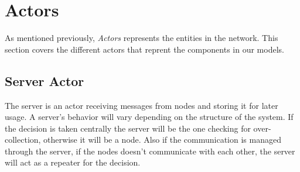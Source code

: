 






\section{Actors}

As mentioned previously, \textit{Actors} represents the entities in the network. This section covers the different actors that reprent the components in our models. 



\subsection{Server Actor}

The server is an actor receiving messages from nodes and storing it for later usage. A server's behavior will vary depending on the structure of the system. If the decision is taken centrally the server will be the one checking for over-collection, otherwise it will be a node. Also if the communication is managed through the server, if the nodes doesn't communicate with each other, the server will act as a repeater for the decision. 


